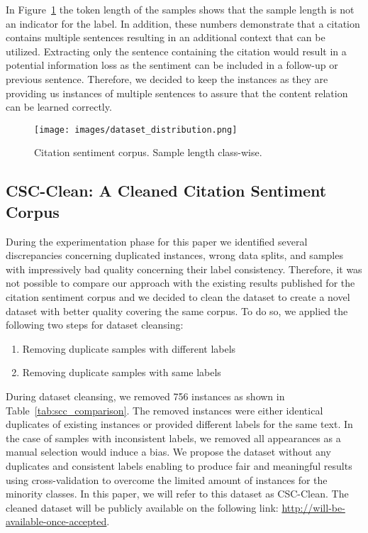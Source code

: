 \documentclass[runningheads]{llncs}
\begin{document}
In Figure~\ref{fig:scc_sample_length} the token length of the samples shows that the sample length is not an indicator for the label. In addition, these numbers demonstrate that a citation contains multiple sentences resulting in an additional context that can be utilized. Extracting only the sentence containing the citation would result in a potential information loss as the sentiment can be included in a follow-up or previous sentence. Therefore, we decided to keep the instances as they are providing us instances of multiple sentences to assure that the content relation can be learned correctly.

\begin{figure}[!t]
\centering
\texttt{[image: images/dataset\_distribution.png]}
\caption{Citation sentiment corpus. Sample length class-wise.}
\label{fig:scc_sample_length}
\end{figure}

\subsection{CSC-Clean: A Cleaned Citation Sentiment Corpus}
During the experimentation phase for this paper we identified several discrepancies concerning duplicated instances, wrong data splits, and samples with impressively bad quality concerning their label consistency. Therefore, it was not possible to compare our approach with the existing results published for the citation sentiment corpus and we decided to clean the dataset to create a novel dataset with better quality covering the same corpus. To do so, we applied the following two steps for dataset cleansing:

\begin{enumerate}
    \item Removing duplicate samples with different labels
    \item Removing duplicate samples with same labels
\end{enumerate}

During dataset cleansing, we removed 756 instances as shown in Table~\ref{tab:scc_comparison}. The removed instances were either identical duplicates of existing instances or provided different labels for the same text. In the case of samples with inconsistent labels, we removed all appearances as a manual selection would induce a bias. We propose the dataset without any duplicates and consistent labels enabling to produce fair and meaningful results using cross-validation to overcome the limited amount of instances for the minority classes. In this paper, we will refer to this dataset as CSC-Clean. The cleaned dataset will be publicly available on the following link: \url{http://will-be-available-once-accepted}. 
\end{document}
